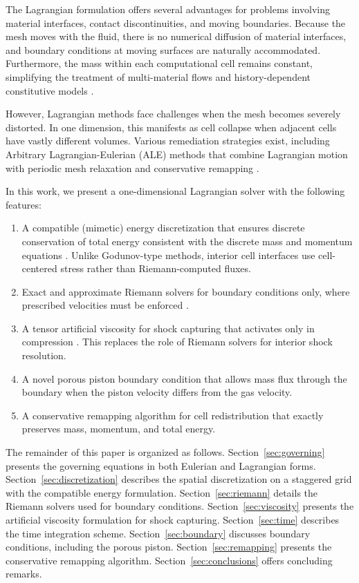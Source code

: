 \documentclass[12pt,a4paper]{article}
\begin{document}
The Lagrangian formulation offers several advantages for problems involving material interfaces, contact discontinuities, and moving boundaries. Because the mesh moves with the fluid, there is no numerical diffusion of material interfaces, and boundary conditions at moving surfaces are naturally accommodated. Furthermore, the mass within each computational cell remains constant, simplifying the treatment of multi-material flows and history-dependent constitutive models \citep{Despres2017}.

However, Lagrangian methods face challenges when the mesh becomes severely distorted. In one dimension, this manifests as cell collapse when adjacent cells have vastly different volumes. Various remediation strategies exist, including Arbitrary Lagrangian-Eulerian (ALE) methods that combine Lagrangian motion with periodic mesh relaxation and conservative remapping \citep{Margolin2003, Loubere2010}.

In this work, we present a one-dimensional Lagrangian solver with the following features:
\begin{enumerate}
    \item A compatible (mimetic) energy discretization that ensures discrete conservation of total energy consistent with the discrete mass and momentum equations \citep{Caramana1998}. Unlike Godunov-type methods, interior cell interfaces use cell-centered stress rather than Riemann-computed fluxes.
    \item Exact and approximate Riemann solvers for boundary conditions only, where prescribed velocities must be enforced \citep{Toro2009}.
    \item A tensor artificial viscosity for shock capturing that activates only in compression \citep{VonNeumann1950, Caramana1998AV}. This replaces the role of Riemann solvers for interior shock resolution.
    \item A novel porous piston boundary condition that allows mass flux through the boundary when the piston velocity differs from the gas velocity.
    \item A conservative remapping algorithm for cell redistribution that exactly preserves mass, momentum, and total energy.
\end{enumerate}

The remainder of this paper is organized as follows. Section~\ref{sec:governing} presents the governing equations in both Eulerian and Lagrangian forms. Section~\ref{sec:discretization} describes the spatial discretization on a staggered grid with the compatible energy formulation. Section~\ref{sec:riemann} details the Riemann solvers used for boundary conditions. Section~\ref{sec:viscosity} presents the artificial viscosity formulation for shock capturing. Section~\ref{sec:time} describes the time integration scheme. Section~\ref{sec:boundary} discusses boundary conditions, including the porous piston. Section~\ref{sec:remapping} presents the conservative remapping algorithm. Section~\ref{sec:conclusions} offers concluding remarks.
\end{document}
